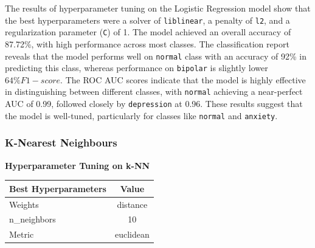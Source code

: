 \noindent
The results of hyperparameter tuning on the Logistic Regression model show that the best hyperparameters were a solver of \texttt{liblinear}, a penalty of \texttt{l2}, and a regularization parameter (\texttt{C}) of 1. The model achieved an overall accuracy of 87.72\%, with high performance across most classes. The classification report reveals that the model performs well on \texttt{normal} class with an accuracy of 92\% in predicting this class, whereas performance on \texttt{bipolar} is slightly lower \(64\% F1-score\). The ROC AUC scores indicate that the model is highly effective in distinguishing between different classes, with \texttt{normal} achieving a near-perfect AUC of 0.99, followed closely by \texttt{depression} at 0.96. These results suggest that the model is well-tuned, particularly for classes like \texttt{normal} and \texttt{anxiety}.

\pagebreak

\subsubsection{K-Nearest Neighbours}
\begin{center}
    \textbf{Hyperparameter Tuning on k-NN} \\[0.5em]
    \begin{tabular}{|l|c|}
        \hline
        \textbf{Best Hyperparameters}  & \textbf{Value} \\ \hline
        Weights                       & distance       \\ \hline
        n\_neighbors                  & 10             \\ \hline
        Metric                        & euclidean      \\ \hline
    \end{tabular}
\end{center}

